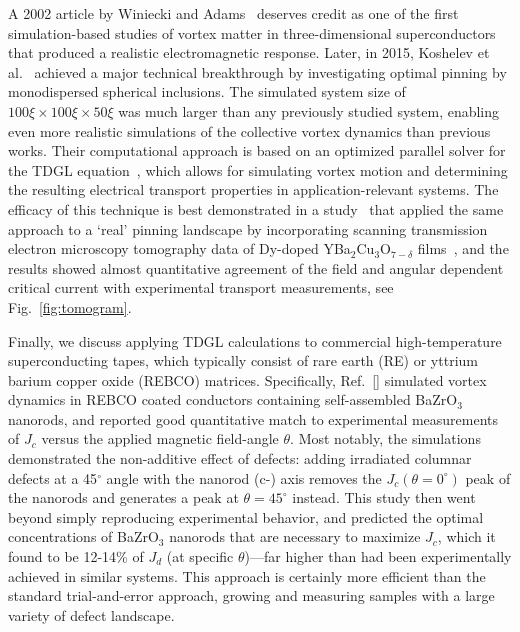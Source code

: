 \documentclass[%
 aip,
 amsmath,amssymb,
 reprint,%
floatfix]{revtex4-1}
\newcommand{\Jc}{J_{c}}
\newcommand{\Jdp}{J_{d}}
\begin{document}
A 2002 article by Winiecki and Adams~\cite{Winiecki:2002} deserves credit as one of the first simulation-based studies of vortex matter in three-dimensional superconductors that produced a realistic electromagnetic response. Later, in 2015, Koshelev et al.~\cite{Koshelev2016} achieved a major technical breakthrough by investigating optimal pinning by monodispersed spherical inclusions. The simulated system size of $100\xi \! \times \! 100\xi \! \times \! 50\xi$ was much larger than any previously studied system, enabling even more realistic simulations of the collective vortex dynamics than previous works.
%
Their computational approach is based on an optimized parallel solver for the TDGL equation~\cite{sadovskyy+jcomp2015}, which allows for simulating vortex motion and determining the resulting electrical transport properties in application-relevant systems. The efficacy of this technique is best demonstrated in a study~\cite{Sadovskyy2016a} that applied the same approach to a `real' pinning landscape by incorporating scanning transmission electron microscopy tomography data of Dy-doped YBa$_2$Cu$_3$O$_{7-\delta}$ films~\cite{Ortalan:2009, Herrera2008}, and the results showed almost quantitative agreement of the field and angular dependent critical current with experimental transport measurements, see Fig.~\ref{fig:tomogram}.



Finally, we discuss applying TDGL calculations to commercial high-temperature superconducting tapes, which typically consist of rare earth (RE) or yttrium barium copper oxide (REBCO) matrices. Specifically, Ref.~[] simulated vortex dynamics in REBCO coated conductors containing self-assembled BaZrO$_3$ nanorods, and reported good quantitative match to experimental measurements of $\Jc$ versus the applied magnetic field-angle $\theta$.  
Most notably, the simulations demonstrated the non-additive effect of defects: adding irradiated columnar defects at a 45$^\circ$ angle with the nanorod (c-) axis removes the $\Jc(\theta=0^\circ)$ peak of the nanorods and generates a peak at $\theta=45^\circ$ instead. This study then went beyond simply reproducing experimental behavior, and predicted the optimal concentrations of BaZrO$_3$ nanorods that are necessary to maximize $\Jc$, which it found to be 12-14\% of $\Jdp$ (at specific $\theta$)---far higher than had been experimentally achieved in similar systems.  This approach is certainly more efficient than the standard trial-and-error approach, growing and measuring samples with a large variety of defect landscape.
\end{document}
